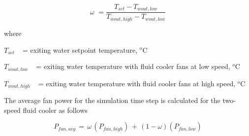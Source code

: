 \begin{equation}
\omega \,\, = \frac{{{T_{set}} - {T_{wout,low}}}}{{{T_{wout,high}} - {T_{wout,low}}}}
\end{equation}

where

\({T_{set}}\) ~ = exiting water setpoint temperature, \(^{o}\)C

\({T_{wout,low}}\) ~ = exiting water temperature with fluid cooler fans at low speed, \(^{o}\)C

\({T_{wout,high}}\) ~ = exiting water temperature with fluid cooler fans at high speed, \(^{o}\)C

The average fan power for the simulation time step is calculated for the two-speed fluid cooler as follows

\begin{equation}
{P_{fan,avg}}\, = \,\omega \,({P_{fan,high}})\, + \,\left( {1 - \omega } \right)\left( {{P_{fan,low}}} \right)
\end{equation}
